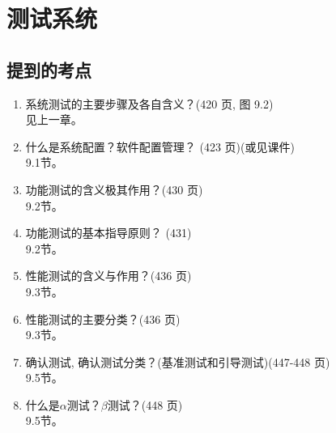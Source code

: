 \documentclass[14pt, letterpaper, UTF8, fontset=windowsnew, heading=true]{article}
\begin{document}
\section{测试系统}

\subsection{提到的考点}

\begin{enumerate}
	\item 系统测试的主要步骤及各自含义？(420 页, 图 9.2) \\
	见上一章。
	
	\item 什么是系统配置？软件配置管理？
	(423 页)(或见课件) \\
	9.1节。
	

	\item 功能测试的含义极其作用？(430 页) \\
	9.2节。
	
	\item 功能测试的基本指导原则？ (431) \\
	9.2节。
	
	\item 性能测试的含义与作用？(436 页) \\
	9.3节。
	
	\item 性能测试的主要分类？(436 页) \\
	9.3节。
	

	\item 确认测试, 确认测试分类？(基准测试和引导测试)(447-448 页) \\
	9.5节。
	
	\item 什么是$\alpha$测试？$\beta$测试？(448 页) \\
	9.5节。
	

\end{enumerate}
\end{document}
